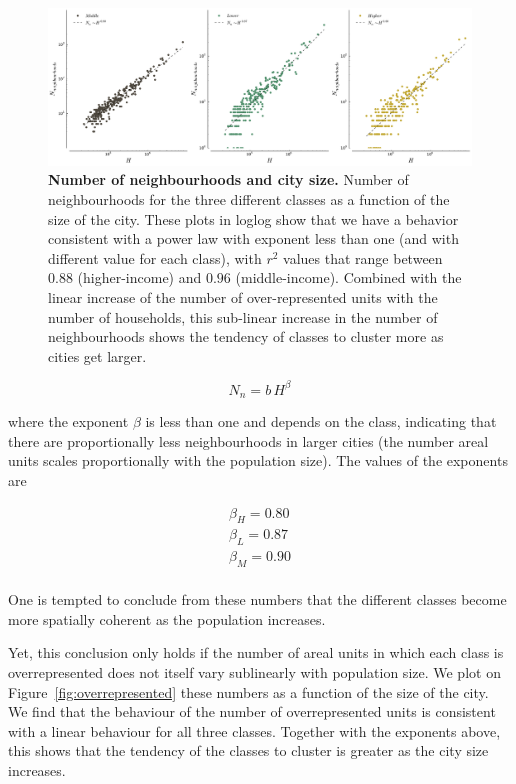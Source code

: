 \begin{figure}
    \centering
    \includegraphics[width=\textwidth]{gfx/chapter-segregation/figure7.pdf}
    \caption{{\bf Number of neighbourhoods and city size.} Number of neighbourhoods for the three different classes as a
    function of the size of the city. These plots in loglog show that
    we have a behavior consistent with a power law with exponent less
    than one (and with different value for each class), with $r^2$ values that
    range between $0.88$ (higher-income) and $0.96$ (middle-income). Combined with the linear
    increase of the number of over-represented units with the number of
    households, this sub-linear increase in the number of neighbourhoods shows the tendency of
classes to cluster more as cities get larger.\label{fig:number_clusters_class}}
\end{figure}

\begin{equation}
    N_n = b\,H^\beta
\end{equation}

where the exponent $\beta$ is less than one and depends on the class, 
indicating that there are proportionally less neighbourhoods
in larger cities (the number areal units scales proportionally with the
population size). The values of the exponents are

\begin{align*}
    \beta_{H} = 0.80\\
    \beta_{L} = 0.87\\
    \beta_{M} = 0.90\\
\end{align*}

One is tempted to conclude from these numbers that the different classes
become more spatially coherent as the population increases. 

Yet, this conclusion only holds if the number of areal units in which each class
is overrepresented does not itself vary sublinearly with population size. We
plot on Figure~\ref{fig:overrepresented} these numbers as a
function of the size of the city. We find that the behaviour of the number of
overrepresented units is consistent with a linear behaviour for all three
classes. Together with the exponents above, this shows that the tendency
of the classes to cluster is greater as the city size increases.


